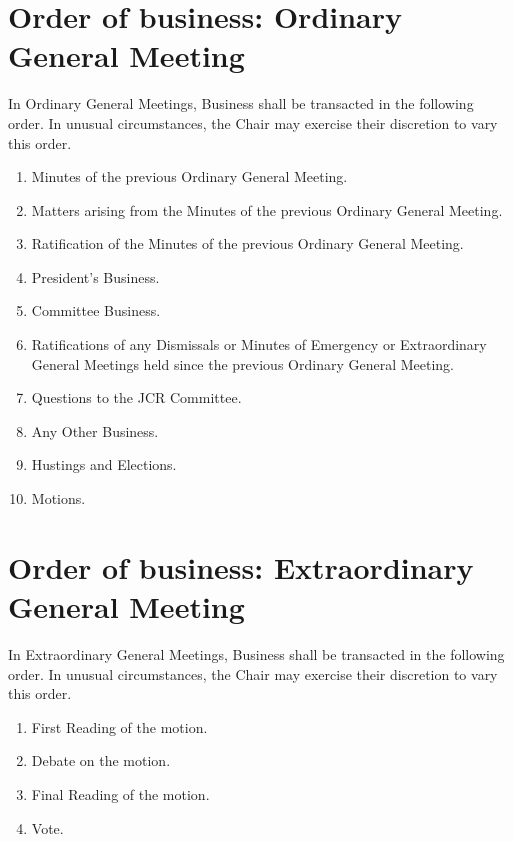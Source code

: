 \section{Order of business: Ordinary General Meeting}
\npara \label{SO:OGMBusiness} In Ordinary General Meetings, Business shall be transacted in the following order.  In unusual circumstances, the Chair may exercise their discretion to vary this order.
\begin{enumerate}
\item Minutes of the previous Ordinary General Meeting.
\item Matters arising from the Minutes of the previous Ordinary General Meeting.
\item Ratification of the Minutes of the previous Ordinary General Meeting.
\item President's Business.
\item \label{SC:CommitteeBusiness} Committee Business.
\item Ratifications of any Dismissals or Minutes of Emergency or Extraordinary General Meetings held since the previous Ordinary General Meeting.
\item \label{SC:CommitteeQuestionTime} Questions to the JCR Committee.
\item Any Other Business.
\item Hustings and Elections.
\item \label{SC:Motions} Motions.
\end{enumerate}
\section{Order of business: Extraordinary General Meeting}
\npara In Extraordinary General Meetings, Business shall be transacted in the following order.  In unusual circumstances, the Chair may exercise their discretion to vary this order.
\begin{enumerate}
\item First Reading of the motion.
\item Debate on the motion.
\item Final Reading of the motion.
\item Vote.
\end{enumerate}
